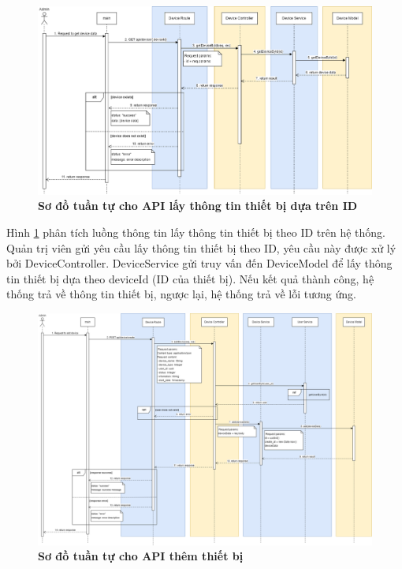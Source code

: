 \begin{figure}[H]
  \centering
  \includegraphics[scale=0.4]{Images/sequence_api/getDeviceById.png}
  \caption[Sơ đồ tuần tự cho API lấy thông tin thiết bị dựa trên ID]{\bfseries \fontsize{12pt}{0pt}
  \selectfont Sơ đồ tuần tự cho API lấy thông tin thiết bị dựa trên ID }
  \label{api_getDeviceById} %
\end{figure}
Hình \ref{api_getDeviceById} phân tích luồng thông tin lấy thông tin thiết bị theo ID trên hệ thống. Quản trị viên gửi yêu cầu lấy thông tin thiết bị theo ID, 
yêu cầu này được xử lý bởi DeviceController. DeviceService gửi truy vấn đến DeviceModel để lấy thông tin thiết bị dựa theo deviceId (ID của thiết bị). 
Nếu kết quả thành công, hệ thống trả về thông tin thiết bị, ngược lại, hệ thống trả về lỗi tương ứng.
\begin{figure}[H]
  \centering
  \includegraphics[scale=0.3]{Images/sequence_api/addDevice.png}
  \caption[Sơ đồ tuần tự cho API thêm thiết bị]{\bfseries \fontsize{12pt}{0pt}
  \selectfont Sơ đồ tuần tự cho API thêm thiết bị }
  \label{api_addDevice} %
\end{figure}
